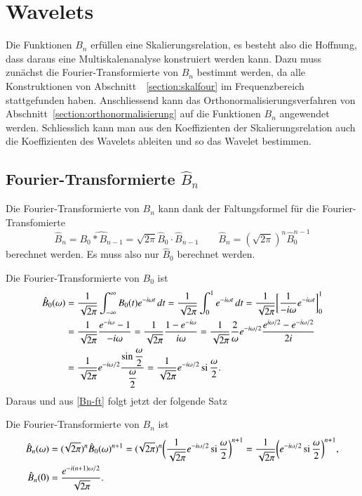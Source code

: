 %
%
%
\section{Wavelets
\label{section:spline-wavelets}}
Die Funktionen $B_n$ erfüllen eine Skalierungsrelation, es besteht also
die Hoffnung, dass daraus eine Multiskalenanalyse konstruiert werden kann.
Dazu muss zunächst die Fourier-Transformierte von $B_n$ bestimmt werden,
da alle Konstruktionen von Abschnitt~ \ref{section:skalfour} im
Frequenzbereich stattgefunden haben.
Anschliessend kann das Orthonormalisierungsverfahren von
Abschnitt~\ref{section:orthonormalisierung} auf die Funktionen $B_n$
angewendet werden.
Schliesslich kann man aus den Koeffizienten der Skalierungsrelation
auch die Koeffizienten des Wavelets ableiten und so das Wavelet
bestimmen.

\subsection{Fourier-Transformierte $\hat{B}_n$
\label{subsection:spline-ft}}
Die Fourier-Transformierte von $B_n$ kann dank der Faltungsformel für die
Fourier-Transfomierte 
\begin{equation}
\hat{B}_n = \widehat{B_0 * B_{n-1}} = \sqrt{2\pi}\hat{B}_0 \cdot \hat{B}_{n-1}
\qquad
\hat{B}_n = (\!\sqrt{2\pi})^n \hat{B}_0^{n-1}
\label{Bn-ft}
\end{equation}
berechnet werden.
Es muss also nur $\hat{B}_0$ berechnet werden.

Die Fourier-Transformierte von $B_0$ ist
\begin{align*}
\hat{B}_0(\omega)
&=
\frac1{\sqrt{2\pi}}
\int_{-\infty}^{\infty}
B_0(t) e^{-i\omega t}\,dt
=
\frac1{\sqrt{2\pi}}
\int_0^1 e^{-i\omega t}\,dt
=
\frac1{\sqrt{2\pi}}
\biggl[
\frac{1}{-i\omega} 
e^{-i\omega t}
\biggr]_0^1
\\
&=
\frac1{\sqrt{2\pi}}
\frac{e^{-i\omega}-1}{-i\omega}
=
\frac1{\sqrt{2\pi}}
\frac{1-e^{-i\omega}}{i\omega}
=
\frac1{\sqrt{2\pi}}
\frac{2}{\omega}
e^{-i\omega/2}
\frac{e^{i\omega/2} - e^{-i\omega/2}}{2i}
\\
&=
\frac1{\sqrt{2\pi}}
e^{-i\omega/2}
\frac{\displaystyle\sin\frac{\omega}2}{\displaystyle\frac{\omega}2}
=
\frac1{\sqrt{2\pi}}
e^{-i\omega/2}
\si\frac{\omega}2.
\end{align*}
Daraus und aus \eqref{Bn-ft} folgt jetzt der folgende Satz

\begin{satz}
\label{satz:Bn-ft}
Die Fourier-Transformierte von $B_n$ ist
\begin{align*}
\hat{B}_n(\omega)
&=
(\!\sqrt{2\pi})^n
\hat{B}_0(\omega)^{n+1}
=
(\!\sqrt{2\pi})^n
\biggl(
\frac{1}{\sqrt{2\pi}}
e^{-i\omega/2} \si\frac{\omega}2
\biggr)^{n+1}
=
\frac{1}{\sqrt{2\pi}}
\biggl(
e^{-i\omega/2} \si\frac{\omega}2
\biggr)^{n+1},
\\
\hat{B}_n(0)
&=
\frac{e^{-i(n+1)\omega/2}}{\sqrt{2\pi}}
.
\end{align*}
\end{satz}

